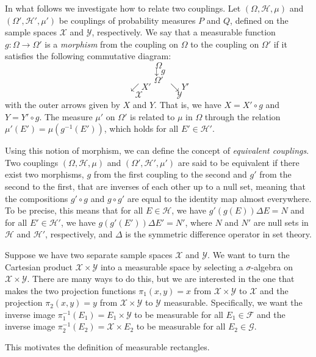 In what follows we investigate how to relate two couplings. Let $(\Omega,\mathcal{H},\mu)$ and $(\Omega',\mathcal{H}',\mu')$ be couplings of probability measures $P$ and $Q$, defined on the sample spaces $\mathcal{X}$ and $\mathcal{Y}$, respectively. We say that a measurable function $g:\Omega\to \Omega'$ is a \textit{morphism} from the coupling on $\Omega$ to the coupling on $\Omega'$ if it satisfies the following commutative diagram:
\[
\Omega
\]
\[
\downarrow g
\]
\[
\Omega'
\]
\[
\swarrow X' \qquad \searrow Y'
\]
\[
\mathcal{X} \qquad \qquad \mathcal{Y}
\]
with the outer arrows given by $X$ and $Y$. That is, we have $X=X'\circ g$ and $Y=Y'\circ g$. The measure $\mu'$ on $\Omega'$ is related to $\mu$ in $\Omega$ through the relation $\mu'(E')=\mu(g^{-1}(E'))$, which holds for all $E'\in \mathcal{H}'$.

Using this notion of morphism, we can define the concept of \textit{equivalent couplings}. Two couplings $(\Omega,\mathcal{H},\mu)$ and $(\Omega',\mathcal{H}',\mu')$ are said to be equivalent if there exist two morphisms, $g$ from the first coupling to the second and $g'$ from the second to the first, that are inverses of each other up to a null set, meaning that the compositions $g'\circ g$ and $g\circ g'$ are equal to the identity map almost everywhere. To be precise, this means that for all $E\in \mathcal{H}$, we have $g'(g(E))\Delta E = N$ and for all $E'\in \mathcal{H}'$, we have $g(g'(E'))\Delta E' = N'$, where $N$ and $N'$ are null sets in $\mathcal{H}$ and $\mathcal{H}'$, respectively, and $\Delta$ is the symmetric difference operator in set theory.

Suppose we have two separate sample spaces $\mathcal{X}$ and $\mathcal{Y}$. We want to turn the Cartesian product $\mathcal{X}\times \mathcal{Y}$ into a measurable space by selecting a $\sigma$-algebra on $\mathcal{X}\times \mathcal{Y}$. There are many ways to do this, but we are interested in the one that makes the two projection functions $\pi_1(x,y)=x$ from $\mathcal{X}\times \mathcal{Y}$ to $\mathcal{X}$ and the projection $\pi_2(x,y)=y$ from $\mathcal{X}\times \mathcal{Y}$ to $\mathcal{Y}$ measurable. Specifically, we want the inverse image $\pi_1^{-1}(E_1)=E_1\times \mathcal{Y}$ to be measurable for all $E_1\in \mathcal{F}$ and the inverse image $\pi_2^{-1}(E_2)=\mathcal{X}\times E_2$ to be measurable for all $E_2\in \mathcal{G}$.

This motivates the definition of measurable rectangles.

